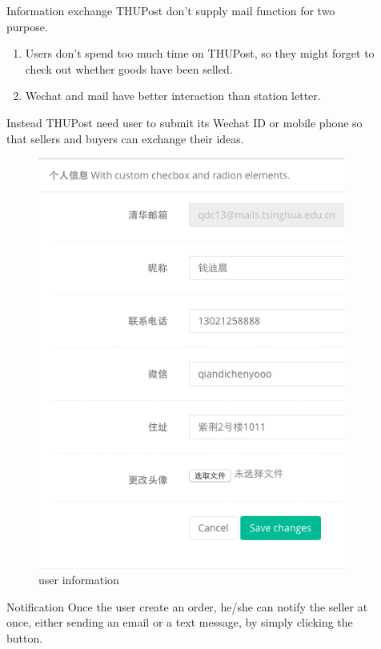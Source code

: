 \documentclass[final]{beamer}
\newlength{\sepwid}
\newlength{\onecolwid}
\begin{document}
\begin{frame}[t]
\begin{columns}[t]
\begin{column}{\onecolwid}
        \begin{block}{Information exchange}
        THUPost don't supply mail function for two purpose. 
        \begin{enumerate}
        \item Users don't spend too much time on THUPost, so they might forget to check out whether goods have been selled.
        \item Wechat and mail have better interaction than station letter.
        \end{enumerate}

        Instead THUPost need user to submit its Wechat ID or mobile phone so that sellers and buyers can exchange their ideas.


        \end{block}

        \begin{figure}
        \includegraphics[width=0.4\linewidth]{information.png}
        \caption{user information}
        \end{figure}


        \begin{block}{Notification}
            Once the user create an order, he/she can notify the seller at once, either sending an email
            or a text message, by simply clicking the button.

        \end{block}




    \end{column} %
    \begin{column}{\sepwid}\end{column} %
    \begin{column}{\onecolwid}\vspace{-.6in} %
    


\end{column}
\end{columns}
\end{frame}
\end{document}
